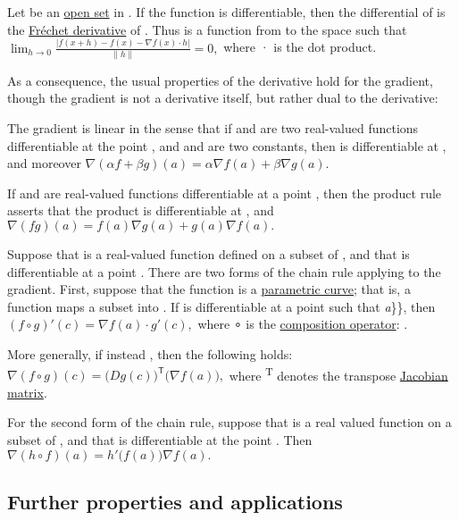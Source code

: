 \documentclass[
]{article}
\providecommand{\tightlist}{%
  \setlength{\itemsep}{0pt}\setlength{\parskip}{0pt}}
\begin{document}
Let be an \href{open_set}{open set} in . If the function is
differentiable, then the differential of is the
\href{Fréchet_derivative}{Fréchet derivative} of . Thus is a function
from to the space such that
\(\lim_{h\to 0} \frac{|f(x+h)-f(x) -\nabla f(x)\cdot h|}{\|h\|} = 0,\)
where · is the dot product.

As a consequence, the usual properties of the derivative hold for the
gradient, though the gradient is not a derivative itself, but rather
dual to the derivative:

\begin{description}
\tightlist
\item[\url{Linearity}]
The gradient is linear in the sense that if and are two real-valued
functions differentiable at the point , and and are two constants, then
is differentiable at , and moreover
\(\nabla\left(\alpha f+\beta g\right)(a) = \alpha \nabla f(a) + \beta\nabla g (a).\)
\item[\href{Product_rule}{Product rule}]
If and are real-valued functions differentiable at a point , then the
product rule asserts that the product is differentiable at , and
\(\nabla (fg)(a) = f(a)\nabla g(a) + g(a)\nabla f(a).\)
\item[\href{Chain_rule}{Chain rule}]
Suppose that is a real-valued function defined on a subset of , and that
is differentiable at a point . There are two forms of the chain rule
applying to the gradient. First, suppose that the function is a
\href{parametric_curve}{parametric curve}; that is, a function maps a
subset into . If is differentiable at a point such that \emph{a}\}\},
then \((f\circ g)'(c) = \nabla f(a)\cdot g'(c),\) where ∘ is the
\href{composition_operator}{composition operator}: .
\end{description}

More generally, if instead , then the following holds:
\(\nabla (f\circ g)(c) = \big(Dg(c)\big)^\mathsf{T} \big(\nabla f(a)\big),\)
where \textsuperscript{T} denotes the transpose
\href{Jacobian_matrix}{Jacobian matrix}.

For the second form of the chain rule, suppose that is a real valued
function on a subset of , and that is differentiable at the point . Then
\(\nabla (h\circ f)(a) = h'\big(f(a)\big)\nabla f(a).\)

\hypertarget{further_properties_and_applications}{%
\subsection{Further properties and
applications}\label{further_properties_and_applications}}
\end{document}
